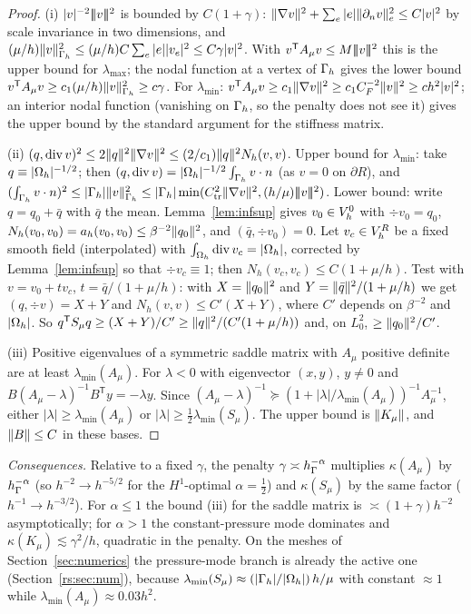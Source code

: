 \begin{proof}
(i) $|v|^{-2}|\!|\!|v|\!|\!|^2$ is bounded by $C(1+\gamma)$: $\lVert \nabla v\rVert^2+\sum_e|e|\lVert \partial_n v\rVert^2_e\le C|v|^2$ by scale invariance in two dimensions, and $(\mu/h)\lVert v\rVert^2_{\Gamma_h}\le(\mu/h)C\sum_e|e||v_e|^2\le C\gamma|v|^2$. With $v^{\mathsf T}A_\mu v\le M|\!|\!|v|\!|\!|^2$ this is the upper bound for $\lambda_{\max}$; the nodal function at a vertex of $\Gamma_h$ gives the lower bound $v^{\mathsf T}A_\mu v\ge c_1(\mu/h)\lVert v\rVert^2_{\Gamma_h}\ge c\gamma$. For $\lambda_{\min}$: $v^{\mathsf T}A_\mu v\ge c_1\lVert \nabla v\rVert^2\ge c_1C_F^{-2}\lVert v\rVert^2\ge ch^2|v|^2$; an interior nodal function (vanishing on $\Gamma_h$, so the penalty does not see it) gives the upper bound by the standard argument for the stiffness matrix.

(ii) $(q,\operatorname{div} v)^2\le2\lVert q\rVert^2\lVert \nabla v\rVert^2\le(2/c_1)\lVert q\rVert^2N_h(v,v)$. Upper bound for $\lambda_{\min}$: take $q\equiv|\Omega_h|^{-1/2}$; then $(q,\operatorname{div} v)=|\Omega_h|^{-1/2}\int_{\Gamma_h}v\cdot n$ (as $v=0$ on $\partial R$), and $(\int_{\Gamma_h}v\cdot n)^2\le|\Gamma_h|\lVert v\rVert^2_{\Gamma_h}\le|\Gamma_h|\min(C_{\mathrm{tr}}^2\lVert \nabla v\rVert^2,(h/\mu)|\!|\!|v|\!|\!|^2)$. Lower bound: write $q=q_0+\bar q$ with $\bar q$ the mean. Lemma~\ref{lem:infsup} gives $v_0\in V_h^0$ with $\div v_0=q_0$, $N_h(v_0,v_0)=a_h(v_0,v_0)\le\beta^{-2}\lVert q_0\rVert^2$, and $(\bar q,\div v_0)=0$. Let $v_c\in V_h^R$ be a fixed smooth field (interpolated) with $\int_{\Omega_h}\operatorname{div} v_c=|\Omega_h|$, corrected by Lemma~\ref{lem:infsup} so that $\div v_c\equiv1$; then $N_h(v_c,v_c)\le C(1+\mu/h)$. Test with $v=v_0+tv_c$, $t=\bar q/(1+\mu/h)$: with $X=\lVert q_0\rVert^2$ and $Y=\lVert \bar q\rVert^2/(1+\mu/h)$ we get $(q,\div v)=X+Y$ and $N_h(v,v)\le C'(X+Y)$, where $C'$ depends on $\beta^{-2}$ and $|\Omega_h|$. So $q^{\mathsf T}S_\mu q\ge(X+Y)/C'\ge\lVert q\rVert^2/(C'(1+\mu/h))$ and, on $L^2_0$, $\ge\lVert q_0\rVert^2/C'$.

(iii) Positive eigenvalues of a symmetric saddle matrix with $A_\mu$ positive definite are at least $\lambda_{\min}(A_\mu)$. For $\lambda<0$ with eigenvector $(x,y)$, $y\ne0$ and $B(A_\mu-\lambda)^{-1}B^{\mathsf T}y=-\lambda y$. Since $(A_\mu-\lambda)^{-1}\succeq(1+|\lambda|/\lambda_{\min}(A_\mu))^{-1}A_\mu^{-1}$, either $|\lambda|\ge\lambda_{\min}(A_\mu)$ or $|\lambda|\ge\frac12\lambda_{\min}(S_\mu)$. The upper bound is $\lVert K_\mu\rVert$, and $\lVert B\rVert\le C$ in these bases.
\end{proof}

\emph{Consequences.} Relative to a fixed $\gamma$, the penalty $\gamma\asymp h_\Gamma^{-\alpha}$ multiplies $\kappa(A_\mu)$ by $h_\Gamma^{-\alpha}$ (so $h^{-2}\to h^{-5/2}$ for the $H^1$-optimal $\alpha=\frac12$) and $\kappa(S_\mu)$ by the same factor ($h^{-1}\to h^{-3/2}$). For $\alpha\le1$ the bound (iii) for the saddle matrix is $\asymp(1+\gamma)h^{-2}$ asymptotically; for $\alpha>1$ the constant-pressure mode dominates and $\kappa(K_\mu)\lesssim\gamma^2/h$, quadratic in the penalty. On the meshes of Section~\ref{sec:numerics} the pressure-mode branch is already the active one (Section~\ref{rs:sec:num}), because $\lambda_{\min}(S_\mu)\approx(|\Gamma_h|/|\Omega_h|)\,h/\mu$ with constant $\approx1$ while $\lambda_{\min}(A_\mu)\approx0.03h^2$.
